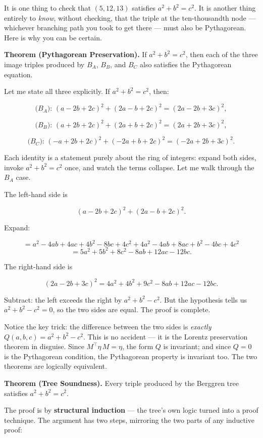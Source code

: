 It is one thing to check that \((5, 12, 13)\) satisfies \(a^2 + b^2 = c^2\). It is another thing entirely to \emph{know}, without checking, that the triple at the ten-thousandth node --- whichever branching path you took to get there --- must also be Pythagorean. Here is why you can be certain.

\textbf{Theorem (Pythagorean Preservation).} If \(a^2 + b^2 = c^2\), then each of the three image triples produced by \(B_A\), \(B_B\), and \(B_C\) also satisfies the Pythagorean equation.

Let me state all three explicitly. If \(a^2 + b^2 = c^2\), then:

\[\text{($B_A$): } (a - 2b + 2c)^2 + (2a - b + 2c)^2 = (2a - 2b + 3c)^2,\]

\[\text{($B_B$): } (a + 2b + 2c)^2 + (2a + b + 2c)^2 = (2a + 2b + 3c)^2,\]

\[\text{($B_C$): } (-a + 2b + 2c)^2 + (-2a + b + 2c)^2 = (-2a + 2b + 3c)^2.\]

Each identity is a statement purely about the ring of integers: expand both sides, invoke \(a^2 + b^2 = c^2\) once, and watch the terms collapse. Let me walk through the \(B_A\) case.

The left-hand side is

\[(a - 2b + 2c)^2 + (2a - b + 2c)^2.\]

Expand:

\[= a^2 - 4ab + 4ac + 4b^2 - 8bc + 4c^2 + 4a^2 - 4ab + 8ac + b^2 - 4bc + 4c^2\] \[= 5a^2 + 5b^2 + 8c^2 - 8ab + 12ac - 12bc.\]

The right-hand side is

\[(2a - 2b + 3c)^2 = 4a^2 + 4b^2 + 9c^2 - 8ab + 12ac - 12bc.\]

Subtract: the left exceeds the right by \(a^2 + b^2 - c^2\). But the hypothesis tells us \(a^2 + b^2 - c^2 = 0\), so the two sides are equal. The proof is complete.

Notice the key trick: the difference between the two sides is \emph{exactly} \(Q(a, b, c) = a^2 + b^2 - c^2\). This is no accident --- it is the Lorentz preservation theorem in disguise. Since \(M^\top \eta\, M = \eta\), the form \(Q\) is invariant; and since \(Q = 0\) is the Pythagorean condition, the Pythagorean property is invariant too. The two theorems are logically equivalent.

\textbf{Theorem (Tree Soundness).} Every triple produced by the Berggren tree satisfies \(a^2 + b^2 = c^2\).

The proof is by \textbf{structural induction} --- the tree's own logic turned into a proof technique. The argument has two steps, mirroring the two parts of any inductive proof:

